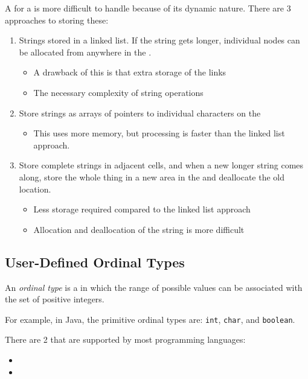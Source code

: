 A  for a  is more difficult to handle because of its dynamic nature.
There are 3 approaches to storing these:
\begin{enumerate}[noitemsep]
\item Strings stored in a linked list. If the string gets longer, individual nodes can be allocated from anywhere in the .
  \begin{itemize}[noitemsep]
  \item A drawback of this is that extra storage of the links
  \item The necessary complexity of string operations
  \end{itemize}
\item Store strings as arrays of pointers to individual characters on the 
  \begin{itemize}[noitemsep]
  \item This uses more memory, but processing is faster than the linked list approach.
  \end{itemize}
\item Store complete strings in adjacent cells, and when a new longer string comes along, store the whole thing in a new area in the  and deallocate the old location.
  \begin{itemize}[noitemsep]
  \item Less storage required compared to the linked list approach
  \item Allocation and deallocation of the string is more difficult
  \end{itemize}
\end{enumerate}

\subsection{User-Defined Ordinal Types}\label{subsec:User_Defined_Ordinal_Types}
\begin{definition}\label{def:Ordinal_Type}
  An \emph{ordinal type} is a  in which the range of possible values can be associated with the set of positive integers.

  For example, in Java, the primitive ordinal types are: \texttt{int}, \texttt{char}, and \texttt{boolean}.

  \begin{remark}
    There are 2  that are supported by most programming languages:
    \begin{itemize}[noitemsep]
    \item {}
    \item {}
    \end{itemize}
  \end{remark}
\end{definition}

